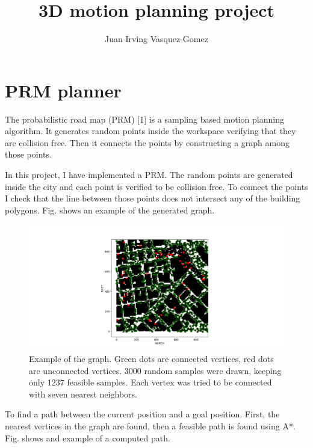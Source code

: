 \documentclass[]{article}
\title{3D motion planning project}
\author{Juan Irving Vasquez-Gomez}
\begin{document}
\maketitle



\section{PRM planner}

The probabilistic road map (PRM) [1] is a sampling based motion planning algorithm. It generates random points inside the workspace verifying that they are collision free. Then it connects the points by constructing a graph among those points. 

In this project, I have implemented a PRM. The random points are generated inside the city and each point is verified to be collision free. To connect the points I check that the line between those points does not intersect any of  the building polygons. Fig. shows an example of the generated graph.

\begin{figure}
\centering
\includegraphics[width=\linewidth, trim={11cm 1cm 11cm 2cm}, clip]{graph}
\caption{Example of the graph. Green dots are connected vertices, red dots are unconnected vertices. 3000 random samples were drawn, keeping only 1237 feasible samples. Each vertex was tried to be connected with seven nearest neighbors. }
\label{fig:graph}
\end{figure}


To find a path between the current position  and a goal position. First, the nearest vertices in the graph are found, then a feasible path is found using A*. Fig. shows and example of a computed path.
\end{document}
